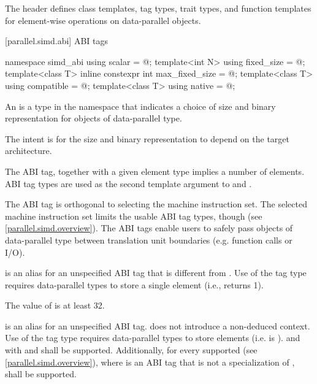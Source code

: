 \pnum
The header  defines class templates, tag types, trait types, and function templates for element-wise operations on data-parallel objects.

[parallel.simd.abi]{ ABI tags}

\begin{codeblock}
namespace simd_abi {
  using scalar = @\seebelow@;
  template<int N> using fixed_size = @\seebelow@;
  template<class T> inline constexpr int max_fixed_size = @\impdef@;
  template<class T> using compatible = @\impdef@;
  template<class T> using native = @\impdef@;
}
\end{codeblock}

\pnum
An  is a type in the  namespace that indicates a choice of size and binary representation for objects of data-parallel type. \begin{note}The intent is for the size and binary representation to depend on the target architecture.\end{note} The ABI tag, together with a given element type implies a number of elements. ABI tag types are used as the second template argument to  and .

\pnum
\begin{note}The ABI tag is orthogonal to selecting the machine instruction set. The selected machine instruction set limits the usable ABI tag types, though (see \ref{parallel.simd.overview}). The ABI tags enable users to safely pass objects of data-parallel type between translation unit boundaries (e.g. function calls or I/O).\end{note}

\pnum
{} is an alias for an unspecified ABI tag that is different from .
Use of the  tag type requires data-parallel types to store a single element (i.e.,  returns 1).

\pnum
The value of  is at least 32.

\pnum
{} is an alias for an unspecified ABI tag.
 does not introduce a non-deduced context.
Use of the  tag type requires data-parallel types to store  elements (i.e.  is ).  and  with  and  shall be supported. Additionally, for every supported  (see \ref{parallel.simd.overview}), where  is an ABI tag that is not a specialization of ,  shall be supported.


